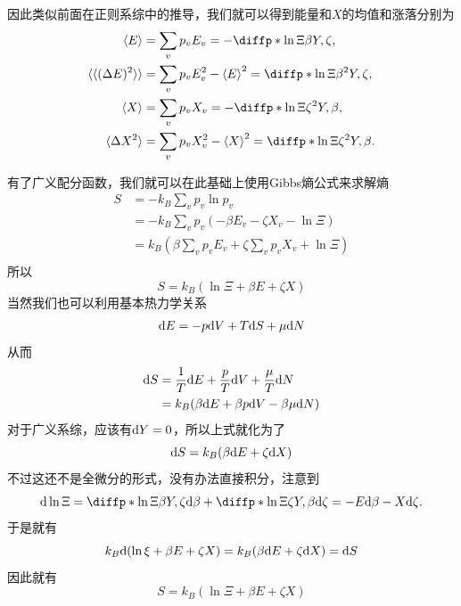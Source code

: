 因此类似前面在正则系综中的推导，我们就可以得到能量和$X$的均值和涨落分别为\begin{equation}
       \begin{aligned}
              \braket{E}&=\sum_v p_v E_v =-\diffp*{\ln \Xi}{\beta}{Y,\zeta},\\
              \braket{\braket{(\Delta E)^2} }&=\sum_v p_v E_v^2 -\braket{E}^2 =\diffp*{\ln \Xi}{{\beta^2}}{Y,\zeta},\\
              \braket{X}&=\sum_v p_v X_v =-\diffp*{\ln \Xi}{{\zeta^2}}{Y,\beta},\\
              \braket{\Delta X^2 }&=\sum_v p_v X_v^2 -\braket{X}^2 =\diffp*{\ln \Xi}{{\zeta^2}}{Y,\beta}.
       \end{aligned}
\end{equation}

有了广义配分函数，我们就可以在此基础上使用Gibbs熵公式来求解熵\begin{equation}
\begin{aligned}
       S&=-k_B \sum_v p_v \ln p_v\\
       &=-k_B \sum_v p_v (-\beta E_v-\zeta X_v-\ln \Xi)\\
       &=k_B (\beta \sum_v p_v E_v+\zeta \sum_v p_v X_v+\ln \Xi)\\
\end{aligned}\end{equation}
所以\begin{equation}
       S=k_B (\ln \Xi+\beta E+\zeta X)
\end{equation}
当然我们也可以利用基本热力学关系\begin{equation}
       \mathrm{d} E= -p \mathrm{d} V +T \mathrm{d} S +\mu \mathrm{d} N
\end{equation}
从而\begin{equation}
\begin{aligned}
       \mathrm{d} S&= \frac{1}{T}\mathrm{d} E+\frac{p}{T}\mathrm{d} V+\frac{\mu}{T}\mathrm{d} N\\
       &=k_B (\beta \mathrm{d} E+ \beta p \mathrm{d} V-\beta \mu \mathrm{d} N)\\
\end{aligned}
\end{equation}
对于广义系综，应该有$\mathrm{d} Y=0$，所以上式就化为了\begin{equation}
       \mathrm{d} S=k_B (\beta \mathrm{d} E+ \zeta \mathrm{d} X)
\end{equation}
不过这还不是全微分的形式，没有办法直接积分，注意到\begin{equation}
       \di \ln \Xi=\diffp*{\ln \Xi}{\beta}{Y,\zeta} \di \beta+\diffp*{\ln \Xi}{\zeta}{Y,\beta} \di \zeta=-E\di\beta -X\di\zeta .
\end{equation}
于是就有\begin{equation}
       k_B \mathrm{d} (\ln \xi + \beta E+\zeta X)=k_B( \beta\mathrm{d} E +\zeta \mathrm{d} X)=\mathrm{d} S
\end{equation}
因此就有\begin{equation}
       S=k_B (\ln \Xi+\beta E+\zeta X)
\end{equation}

